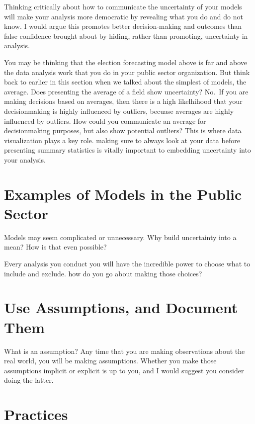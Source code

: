 \documentclass[]{book}
\begin{document}
Thinking critically about how to communicate the uncertainty of your models will make your analysis more democratic by revealing what you do and do not know. I would argue this promotes better decision-making and outcomes than false confidence brought about by hiding, rather than promoting, uncertainty in analysis.

You may be thinking that the election forecasting model above is far and above the data analysis work that you do in your public sector organization. But think back to earlier in this section when we talked about the simplest of models, the average. Does presenting the average of a field show uncertainty? No.~If you are making decisions based on averages, then there is a high likelhihood that your decisionmaking is highly influenced by outliers, becuase averages are highly influenced by outliers. How could you communicate an average for decisionmaking purposes, but also show potential outliers? This is where data visualization plays a key role. making sure to always look at your data before presenting summary statistics is vitally important to embedding uncertainty into your analysis.

\hypertarget{examples-of-models-in-the-public-sector}{%
\section{Examples of Models in the Public Sector}\label{examples-of-models-in-the-public-sector}}

Models may seem complicated or unnecessary. Why build uncertainty into a mean? How is that even possible?

Every analysis you conduct you will have the incredible power to choose what to include and exclude. how do you go about making those choices?

\hypertarget{use-assumptions-and-document-them}{%
\section{Use Assumptions, and Document Them}\label{use-assumptions-and-document-them}}

What is an assumption? Any time that you are making observations about the real world, you will be making assumptions. Whether you make those assumptions implicit or explicit is up to you, and I would suggest you consider doing the latter.

\hypertarget{practices-2}{%
\section{Practices}\label{practices-2}}
\end{document}
